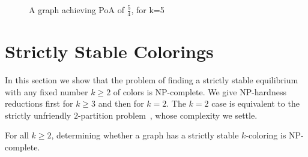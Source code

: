 \documentclass{llncs}
\begin{document}
\begin{figure}[htb]
\centering
{}
\caption{A graph achieving PoA of $\frac{5}{4}$, for k=5}
\label{fig:k5copies}
\end{figure}

\section{Strictly Stable Colorings}

In this section we show that the problem of finding a strictly stable equilibrium
with any fixed number $k \geq 2$ of colors is NP-complete.  We give NP-hardness
reductions first for $k \geq 3$ and then for $k=2$.  The $k=2$ case is
equivalent to the strictly unfriendly $2$-partition problem~\cite{ShafiqueD09},
whose complexity we settle.

\begin{theorem} 
For all $k \geq 2$, determining whether a graph has a strictly stable
$k$-coloring is NP-complete.  
\end{theorem}
\end{document}
